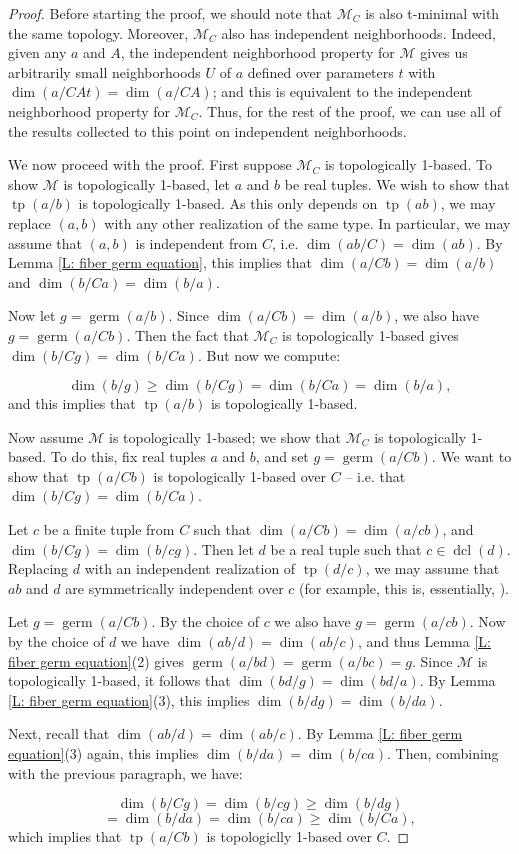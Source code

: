 \documentclass{amsart}
\theoremstyle{definition}
\newcommand{\dcl}{\operatorname{dcl}}
\newcommand{\tp}{\operatorname{tp}}
\begin{document}
\begin{proof}

Before starting the proof, we should note that $\mathcal M_C$ is also t-minimal with the same topology. Moreover, $\mathcal M_C$ also has independent neighborhoods. Indeed, given any $a$ and $A$, the independent neighborhood property for $\mathcal M$ gives us arbitrarily small neighborhoods $U$ of $a$ defined over parameters $t$ with $\dim(a/CAt)=\dim(a/CA)$; and this is equivalent to the independent neighborhood property for $\mathcal M_C$. Thus, for the rest of the proof, we can use all of the results collected to this point on independent neighborhoods.

We now proceed with the proof. First suppose $\mathcal M_C$ is topologically 1-based. To show $\mathcal M$ is topologically 1-based, let $a$ and $b$ be real tuples. We wish to show that $\tp(a/b)$ is topologically 1-based. As this only depends on $\tp(ab)$, we may replace $(a,b)$ with any other realization of the same type. In particular, we may assume that $(a,b)$ is independent from $C$, i.e. $\dim(ab/C)=\dim(ab)$. By Lemma \ref{L: fiber germ equation}, this implies that $\dim(a/Cb)=\dim(a/b)$ and $\dim(b/Ca)=\dim(b/a)$.

Now let $g=\operatorname{germ}(a/b)$. Since $\dim(a/Cb)=\dim(a/b)$, we also have $g=\operatorname{germ}(a/Cb)$. Then the fact that $\mathcal M_C$ is topologically 1-based gives $\dim(b/Cg)=\dim(b/Ca)$. But now we compute:

$$\dim(b/g)\geq\dim(b/Cg)=\dim(b/Ca)=\dim(b/a),$$ and this implies that $\tp(a/b)$ is topologically 1-based.

Now assume $\mathcal M$ is topologically 1-based; we show that $\mathcal M_C$ is topologically 1-based. To do this, fix real tuples $a$ and $b$, and set $g=\operatorname{germ}(a/Cb)$. We want to show that $\tp(a/Cb)$ is topologically 1-based over $C$ -- i.e. that $\dim(b/Cg)=\dim(b/Ca)$.

Let $c$ be a finite tuple from $C$ such that $\dim(a/Cb)=\dim(a/cb)$, and $\dim(b/Cg)=\dim(b/cg)$. Then let $d$ be a real tuple such that $c\in\dcl(d)$. Replacing $d$ with an independent realization of $\tp(d/c)$, we may assume that $ab$ and $d$ are symmetrically independent over $c$ (for example, this is, essentially, \cite[Corollary 2.16]{t-minimal-johnson}). 

Let $g=\operatorname{germ}(a/Cb)$. By the choice of $c$ we also have $g=\operatorname{germ}(a/cb)$. Now by the choice of $d$ we have $\dim(ab/d)=\dim(ab/c)$, and thus Lemma \ref{L: fiber germ equation}(2) gives $\operatorname{germ}(a/bd)=\operatorname{germ}(a/bc)=g$. Since $\mathcal M$ is topologically 1-based, it follows that $\dim(bd/g)=\dim(bd/a)$. By Lemma \ref{L: fiber germ equation}(3), this implies $\dim(b/dg)=\dim(b/da)$.

Next, recall that $\dim(ab/d)=\dim(ab/c)$. By Lemma \ref{L: fiber germ equation}(3) again, this implies $\dim(b/da)=\dim(b/ca)$. Then, combining with the previous paragraph, we have:

$$\dim(b/Cg)=\dim(b/cg)\geq\dim(b/dg)$$ $$=\dim(b/da)=\dim(b/ca)\geq\dim(b/Ca),$$ which implies that $\tp(a/Cb)$ is topologiclly 1-based over $C$.
\end{proof}
\end{document}
